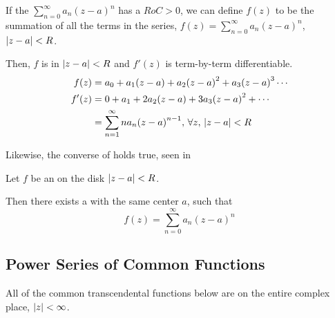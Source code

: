 \begin{theorem}\label{thm:Power_Series-Analytic_Function}
  If the  $\sum_{n=0}^{\infty} a_{n} {(z-a)}^{n}$ has a  $RoC > 0$, we can define $f(z)$ to be the summation of all the terms in the series, $f(z) = \sum_{n = 0}^{\infty} a_{n} {(z-a)}^{n}$, $\left\lvert z-a \right\rvert < R$.

  Then, $f$ is  in $\left\lvert z-a \right\rvert < R$ and $f'(z)$ is term-by-term differentiable.
  \begin{align*}
    f(z) &= a_{0} + a_{1} (z-a) + a_{2} {(z-a)}^{2} + a_{3} {(z-a)}^{3} \cdots \\
    f'(z) &= 0 + a_{1} + 2 a_{2} (z-a) + 3 a_{3} {(z-a)}^{2} + \cdots \\
         &= \sum_{n=1}^{\infty} n a_{n} {(z-a)}^{n-1}, \, \forall z, \, \left\lvert z-a \right\rvert < R
  \end{align*}
\end{theorem}

Likewise, the converse of  holds true, seen in 

\begin{theorem}\label{thm:Analytic_Function-Power_Series}
  Let $f$ be an   on the disk $\left\lvert z-a \right\rvert < R$.

  Then there exists a  with the same center $a$, such that
  \begin{equation*}
    f(z) = \sum_{n = 0}^{\infty} a_{n} {(z-a)}^{n}
  \end{equation*}
\end{theorem}

\subsection{Power Series of Common Functions}\label{subsec:Common_Function_Power_Series}
All of the common transcendental functions below are  on the entire complex place, $\left\lvert z \right\rvert < \infty$.

